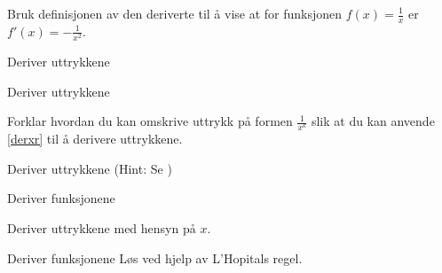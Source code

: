 





\opgt

Bruk definisjonen av den deriverte til å vise at for funksjonen $f(x)=\frac{1}{x} $ er $ f'(x)=-\frac{1}{x^2} $.

Deriver uttrykkene\os
{}

Deriver uttrykkene \os
{}

Forklar hvordan du kan omskrive uttrykk på formen $\frac{1}{x^k} $ slik at du kan anvende \eqref{derxr} til å derivere uttrykkene.

Deriver uttrykkene (Hint: Se )\os
{}

Deriver funksjonene \os
{}

Deriver uttrykkene med hensyn på $ x $. \os



\nes


Deriver funksjonene \os
{}
\newpage
{}
Løs  ved hjelp av L'Hopitals regel.

